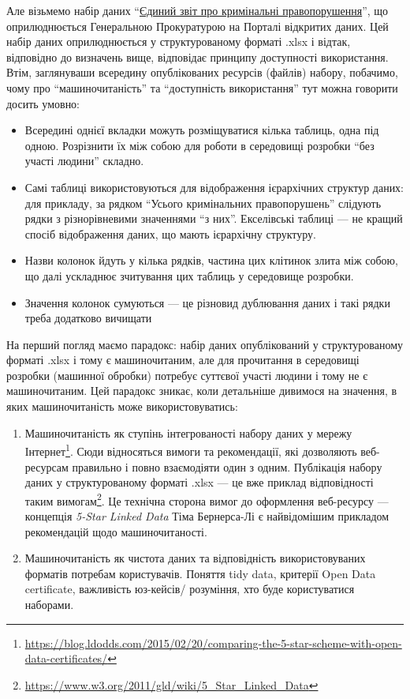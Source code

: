 \documentclass[
]{agujournal2019}
\providecommand{\tightlist}{%
  \setlength{\itemsep}{0pt}\setlength{\parskip}{0pt}}\usepackage{longtable,booktabs,array}
\begin{document}
Але візьмемо набір даних
``\href{https://data.gov.ua/dataset/8b9b1677-2407-454a-bfa7-76eb638c0ea1}{Єдиний
звіт про кримінальні правопорушення}'', що оприлюднюється Генеральною
Прокуратурою на Порталі відкритих даних. Цей набір даних оприлюднюється
у структурованому форматі .xlsx і відтак, відповідно до визначень вище,
відповідає принципу доступності використання. Втім, заглянуваши
всередину опублікованих ресурсів (файлів) набору, побачимо, чому про
``машиночитаність'' та ``доступність використання'' тут можна говорити
досить умовно:

\begin{itemize}
\tightlist
\item
  Всередині однієї вкладки можуть розміщуватися кілька таблиць, одна під
  одною. Розрізнити їх між собою для роботи в середовищі розробки ``без
  участі людини'' складно.
\item
  Самі таблиці використовуються для відображення ієрархічних структур
  даних: для прикладу, за рядком ``Усього кримінальних правопорушень''
  слідують рядки з різнорівневими значеннями ``з них''. Екселівські
  таблиці --- не кращий спосіб відображення даних, що мають ієрархічну
  структуру.
\item
  Назви колонок йдуть у кілька рядків, частина цих клітинок злита між
  собою, що далі ускладнює зчитування цих таблиць у середовище розробки.
\item
  Значення колонок сумуються --- це різновид дублювання даних і такі
  рядки треба додатково вичищати
\end{itemize}

На перший погляд маємо парадокс: набір даних опублікований у
структурованому форматі .xlsx і тому є машиночитаним, але для прочитання
в середовищі розробки (машинної обробки) потребує суттєвої участі людини
і тому не є машиночитаним. Цей парадокс зникає, коли детальніше дивимося
на значення, в яких машиночитаність може використовуватись:

\begin{enumerate}
\def\labelenumi{\arabic{enumi}.}
\tightlist
\item
  Машиночитаність як ступінь інтегрованості набору даних у мережу
  Інтернет\footnote{\url{https://blog.ldodds.com/2015/02/20/comparing-the-5-star-scheme-with-open-data-certificates/}}.
  Сюди відносяться вимоги та рекомендації, які дозволяють веб-ресурсам
  правильно і повно взаємодіяти один з одним. Публікація набору даних у
  структурованому форматі .xlsx --- це вже приклад відповідності таким
  вимогам\footnote{\url{https://www.w3.org/2011/gld/wiki/5_Star_Linked_Data}}.
  Це технічна сторона вимог до оформлення веб-ресурсу --- концепція
  \emph{5-Star Linked Data} Тіма Бернерса-Лі є найвідомішим прикладом
  рекомендацій щодо машиночитаності.
\item
  Машиночитаність як чистота даних та відповідність використовуваних
  форматів потребам користувачів. Поняття tidy data, критерії Open Data
  certificate, важливість юз-кейсів/ розуміння, хто буде користуватися
  наборами.
\end{enumerate}
\end{document}
